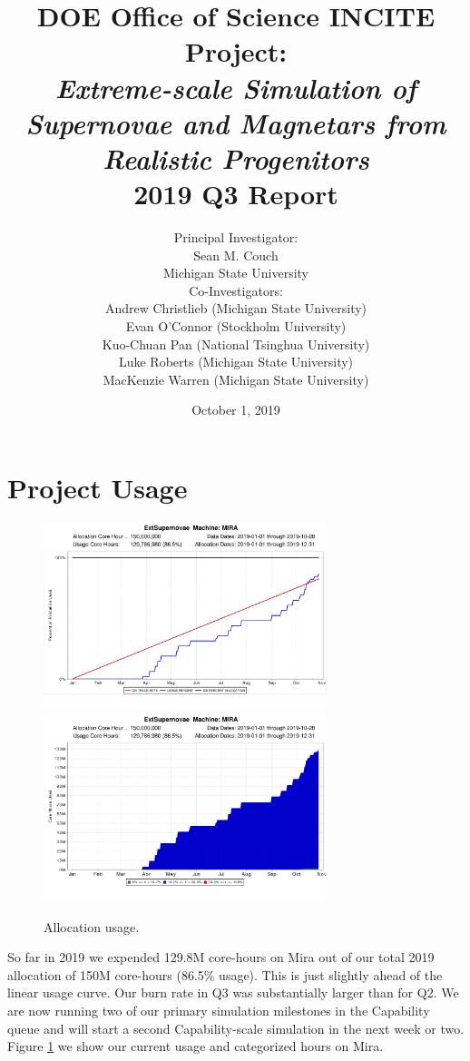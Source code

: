 \documentclass[12pt,titlepage]{article}
\title{DOE Office of Science INCITE Project:\\
{\it Extreme-scale Simulation of Supernovae and Magnetars from Realistic Progenitors}\\
2019 Q3 Report}
\author{Principal Investigator:\\Sean M. Couch\\
  Michigan State University \vspace{0.1in}\\
  Co-Investigators: \\
  Andrew Christlieb (Michigan State University) \\
  Evan O'Connor (Stockholm University)\\
  Kuo-Chuan Pan (National Tsinghua University) \\
  Luke Roberts (Michigan State University) \\
  MacKenzie Warren (Michigan State University) \\
}
\date{October 1, 2019}
\begin{document}
\maketitle


\section{Project Usage}



\begin{figure}
    \includegraphics[width=3.25in]{on_track_graph_mira.png}
    \includegraphics[width=3.25in]{categorized_hours_graph_mira.png} \\
  \caption{Allocation usage.}
  \label{fig:usage}
\end{figure}

So far in 2019 we expended 129.8M core-hours on Mira out of our total 2019 allocation of 150M core-hours (86.5\% usage). 
This is just slightly ahead of the linear usage curve.
Our burn rate in Q3 was substantially larger than for Q2.
We are now running two of our primary simulation milestones in the Capability queue and will start a second Capability-scale simulation in the next week or two. 
Figure \ref{fig:usage} we show our current usage and categorized hours on Mira.
\end{document}
